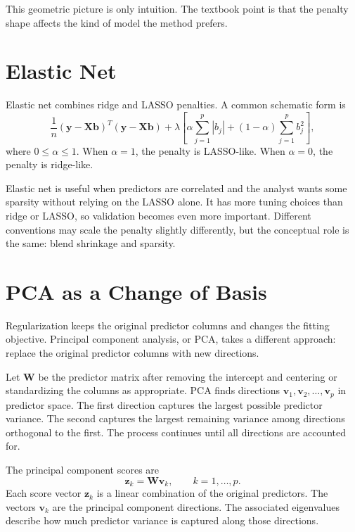 This geometric picture is only intuition.  The textbook point is that the penalty shape affects the kind of model the method prefers.

\section{Elastic Net}

Elastic net combines ridge and LASSO penalties.  A common schematic form is
\begin{equation}
  \frac{1}{n}(\mathbf{y}-\mathbf{X}\mathbf{b})^T(\mathbf{y}-\mathbf{X}\mathbf{b})
  +\lambda\left[
    \alpha\sum_{j=1}^{p}|b_j|
    +(1-\alpha)\sum_{j=1}^{p}b_j^2
  \right],
  \label{eq:ch16-elastic-net-objective}
\end{equation}
where \(0\leq\alpha\leq 1\).  When \(\alpha=1\), the penalty is LASSO-like.  When \(\alpha=0\), the penalty is ridge-like.

Elastic net is useful when predictors are correlated and the analyst wants some sparsity without relying on the LASSO alone.  It has more tuning choices than ridge or LASSO, so validation becomes even more important.  Different conventions may scale the penalty slightly differently, but the conceptual role is the same: blend shrinkage and sparsity.

\section{PCA as a Change of Basis}

Regularization keeps the original predictor columns and changes the fitting objective.  Principal component analysis, or PCA, takes a different approach: replace the original predictor columns with new directions.

Let \(\mathbf{W}\) be the predictor matrix after removing the intercept and centering or standardizing the columns as appropriate.  PCA finds directions \(\mathbf{v}_1,\mathbf{v}_2,\ldots,\mathbf{v}_p\) in predictor space.  The first direction captures the largest possible predictor variance.  The second captures the largest remaining variance among directions orthogonal to the first.  The process continues until all directions are accounted for.

The principal component scores are
\begin{equation}
  \mathbf{z}_k = \mathbf{W}\mathbf{v}_k,
  \qquad k=1,\ldots,p.
\end{equation}
Each score vector \(\mathbf{z}_k\) is a linear combination of the original predictors.  The vectors \(\mathbf{v}_k\) are the principal component directions.  The associated eigenvalues describe how much predictor variance is captured along those directions.

